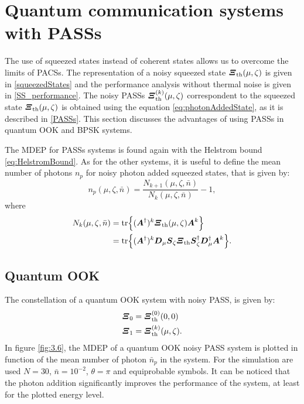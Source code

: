 \section{Quantum communication systems with PASSs}
    The use of squeezed states instead of coherent states allows us to overcome the limits
    of PACSs. The representation of a noisy squeezed state $\Operator{\varXi}_{\mathrm{th}}(\mu,\zeta)$ is given in 
    \ref{squeezedStates} and the performance analysis without thermal noise is given in 
    \ref{SS_performance}.
    The noisy PASSs $\Operator{\varXi}_{\mathrm{th}}^{(k)}(\mu,\zeta)$ correspondent to the squeezed state
    $\Operator{\varXi}_{\mathrm{th}}(\mu,\zeta)$ is obtained using the equation
    \ref{eq:photonAddedState}, as it is described in \ref{PASSs}. This section discusses the advantages of using PASSs 
    in quantum OOK and BPSK systems.

    The MDEP for PASSs systems is found again with the Helstrom bound \ref{eq:HelstromBound}.
    As for the other systems, it is useful to define the mean number of photons $n_p$ for noisy 
    photon added squeezed states, that is given by:
    \begin{equation}
        n_p(\mu,\zeta,\bar{n}) = \frac{N_{k+1}(\mu,\zeta,\bar{n})}{N_k(\mu,\zeta,\bar{n})}-1,
        \label{eq:np_PASS}
    \end{equation}
    where
    \begin{equation}
        \begin{split}
            N_k(\mu,\zeta,\bar{n}) &= \tr{(\Operator{A}^\dagger)^k \Operator{\varXi}_{\mathrm{th}}(\mu,\zeta) \Operator{A}^k}\\
                                    &= \tr{(\Operator{A}^\dagger)^k \Operator{D}_\mu \Operator{S}_\zeta \Operator{\varXi}_{\mathrm{th}}
                                    \Operator{S}_\zeta^\dagger \Operator{D}_\mu^\dagger \Operator{A}^k}.
        \end{split}
    \end{equation}

    \subsection{Quantum OOK}
        The constellation of a quantum OOK system with noisy PASS, is given by:
        \begin{subequations}
            \begin{align}
                \Operator{\varXi}_0 &= \Operator{\varXi}_{\mathrm{th}}^{(0)}(0,0)\\
                \Operator{\varXi}_1 &= \Operator{\varXi}_{\mathrm{th}}^{(k)}(\mu,\zeta).
            \end{align}
        \end{subequations}
        In figure \ref{fig:3.6}, the MDEP of a quantum OOK noisy PASS system is plotted in function
        of the mean number of photon $\bar{n}_p$ in the system. For the simulation are used $N=30$, $\bar{n}=10^{-2}$, $\theta=\pi$ and
        equiprobable symbols.
        It can be noticed that the photon addition significantly improves the performance of the system,
        at least for the plotted energy level.

